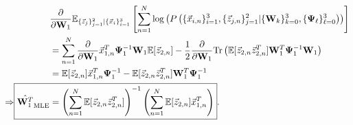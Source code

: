\begin{align*}
  &\frac{\partial} {\partial \W_1} \ecll \\
  &= \sum_{n=1}^N \frac{\partial}{\partial \W_1} \x_{1,n}^T \bpsi_1^{-1} \W_1 \ev
    [\z_{2,n}] - \frac{1}{2} \frac{\partial}{\partial \W_1} \Tr \left( \ev
    [\z_{2,n} \z_{2,n}^T] \W_1^T \bpsi_1^{-1} \W_1 \right)\\
  &= \ev[\z_{2,n}] \x_{1,n}^T \bpsi_1^{-1} - \ev [ \z_{2,n} \z_{2,n}^T] \W_1^T
    \bpsi_1^{-1} \\
    \Rightarrow \Aboxed{ \hat{ \W_1^T }_{\text{MLE}} &= \left(
                                                       \sum_{n=1}^N
                                                       \ev [ \z_{2,n}
                                                       \z_{2,n}^T]
                                                       \right)^{-1}
                                                       \left(
                                                       \sum_{n=1}^N \ev [ \z_{2,n}]
      \x_{1,n}^T  \right)}
.\end{align*}

